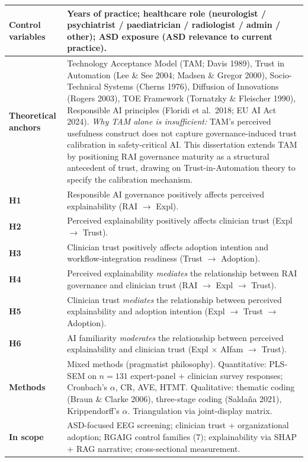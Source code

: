 {\begin{xltabular}{\textwidth}{@{} >{\raggedright\arraybackslash}p{3.0cm} L @{}}
\textbf{Control variables} & Years of practice; healthcare role (neurologist / psychiatrist / paediatrician / radiologist / admin / other); ASD exposure (ASD relevance to current practice). \\
\midrule
\textbf{Theoretical anchors} & Technology Acceptance Model (TAM; Davis 1989), Trust in Automation (Lee \& See 2004; Madsen \& Gregor 2000), Socio-Technical Systems (Cherns 1976), Diffusion of Innovations (Rogers 2003), TOE Framework (Tornatzky \& Fleischer 1990), Responsible AI principles (Floridi et al.\ 2018; EU AI Act 2024). \emph{Why TAM alone is insufficient:} TAM's perceived usefulness construct does not capture governance-induced trust calibration in safety-critical AI. This dissertation extends TAM by positioning RAI governance maturity as a structural antecedent of trust, drawing on Trust-in-Automation theory to specify the calibration mechanism. \\
\midrule
\textbf{H1} & Responsible AI governance positively affects perceived explainability \quad (RAI $\to$ Expl). \\
\textbf{H2} & Perceived explainability positively affects clinician trust \quad (Expl $\to$ Trust). \\
\textbf{H3} & Clinician trust positively affects adoption intention and workflow-integration readiness \quad (Trust $\to$ Adoption). \\
\textbf{H4} & Perceived explainability \emph{mediates} the relationship between RAI governance and clinician trust \quad (RAI $\to$ Expl $\to$ Trust). \\
\textbf{H5} & Clinician trust \emph{mediates} the relationship between perceived explainability and adoption intention \quad (Expl $\to$ Trust $\to$ Adoption). \\
\textbf{H6} & AI familiarity \emph{moderates} the relationship between perceived explainability and clinician trust \quad (Expl $\times$ AIfam $\to$ Trust). \\
\midrule
\textbf{Methods} & Mixed methods (pragmatist philosophy). Quantitative: PLS-SEM on $n=131$ expert-panel + clinician survey responses; Cronbach's $\alpha$, CR, AVE, HTMT. Qualitative: thematic coding (Braun \& Clarke 2006), three-stage coding (Salda\~na 2021), Krippendorff's $\alpha$. Triangulation via joint-display matrix. \\
\midrule
\textbf{In scope} & ASD-focused EEG screening; clinician trust + organizational adoption; RGAIG control families (7); explainability via SHAP + RAG narrative; cross-sectional measurement. \\

\end{xltabular}}
